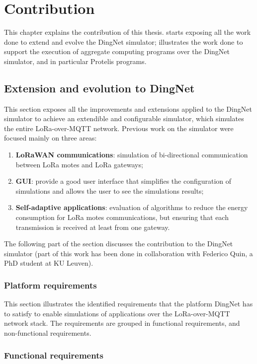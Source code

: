 \chapter{Contribution}
\label{chap:contribution}
This chapter explains the contribution of this thesis.  starts exposing all the work done to extend and evolve the DingNet simulator;  illustrates  the work done to support the execution of aggregate computing programs over the DingNet simulator, and in particular Protelis programs. 

\section{Extension and evolution to DingNet}
\label{sec:contributionDingNet}
This section exposes all the improvements and extensions applied to the DingNet simulator to achieve an extendible and configurable simulator, which simulates the entire LoRa-over-MQTT network. 
Previous work on the simulator were focused mainly on three areas:
\begin{enumerate}
    \item \textbf{LoRaWAN communications}: simulation of bi-directional communication between LoRa motes and LoRa gateways;
    \item \textbf{GUI}: provide a good user interface that simplifies the configuration of simulations and allows the user to see the simulations results;
    \item \textbf{Self-adaptive applications}: evaluation of algorithms to reduce the energy consumption for LoRa motes communications, but ensuring that each transmission is received at least from one gateway.
\end{enumerate}
The following part of the section discusses the contribution to the DingNet simulator (part of this work has been done in collaboration with Federico Quin, a PhD student at KU Leuven).
\clearpage
\subsection{Platform requirements}

This section illustrates the identified requirements that the platform DingNet has to satisfy to enable simulations of applications over the LoRa-over-MQTT network stack.
The requirements are grouped in functional requirements, and non-functional requirements.

\subsection*{Functional requirements}

